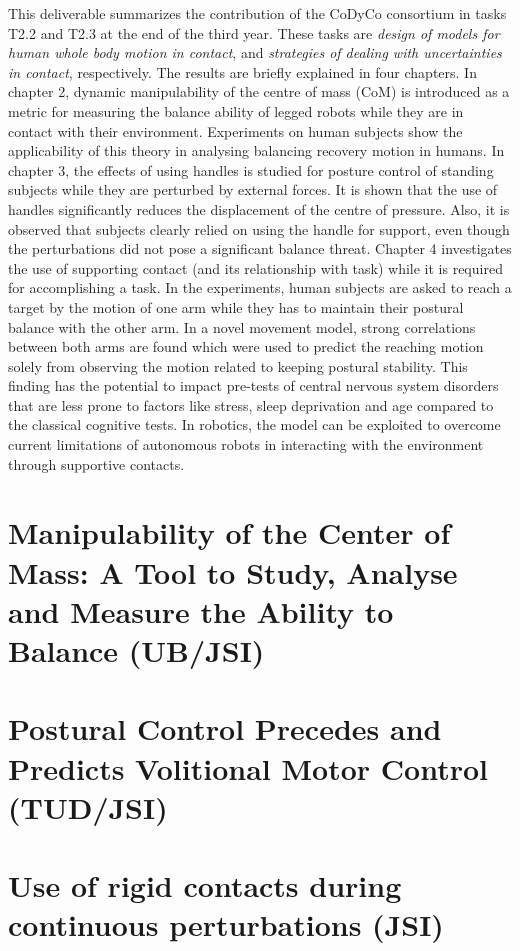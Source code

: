 \documentclass[12pt,a4paper,twoside]{report}
\begin{document}
This deliverable summarizes the contribution of the CoDyCo consortium in tasks
T2.2 and T2.3 at the end of the third year.  These tasks are \textit{design of
  models for human whole body motion in contact}, and \textit{strategies of
  dealing with uncertainties in contact}, respectively.  The results are
briefly explained in four chapters.  In chapter 2, dynamic manipulability of
the centre of mass (CoM) is introduced as a metric for measuring the balance
ability of legged robots while they are in contact with their environment.
Experiments on human subjects show the applicability of this theory in
analysing balancing recovery motion in humans.  In chapter 3, the effects of
using handles is studied for posture control of standing subjects while they
are perturbed by external forces.  It is shown that the use of handles
significantly reduces the displacement of the centre of pressure.  Also, it is
observed that subjects clearly relied on using the handle for support, even
though the perturbations did not pose a significant balance threat.  Chapter 4
investigates the use of supporting contact (and its relationship with task)
while it is required for accomplishing a task.  In the experiments, human
subjects are asked to reach a target by the motion of one arm while they has
to maintain their postural balance with the other arm.  In a novel movement
model, strong correlations between both arms are found which were used to
predict the reaching motion solely from observing the motion related to
keeping postural stability. This finding has the potential to impact pre-tests
of central nervous system disorders that are less prone to factors like
stress, sleep deprivation and age compared to the classical cognitive tests.
In robotics, the model can be exploited to overcome current limitations of
autonomous robots in interacting with the environment through supportive
contacts.


\chapter{Manipulability of the Center of Mass: A Tool to Study, Analyse and
  Measure the Ability to Balance (UB/JSI)}\label{sec:Morteza}


\chapter{Postural Control Precedes and Predicts Volitional Motor Control
  (TUD/JSI)}\label{sec:ElmarPrePrint}


\chapter{Use of rigid contacts during continuous perturbations
  (JSI)}\label{sec:Jernej}




\end{document}
